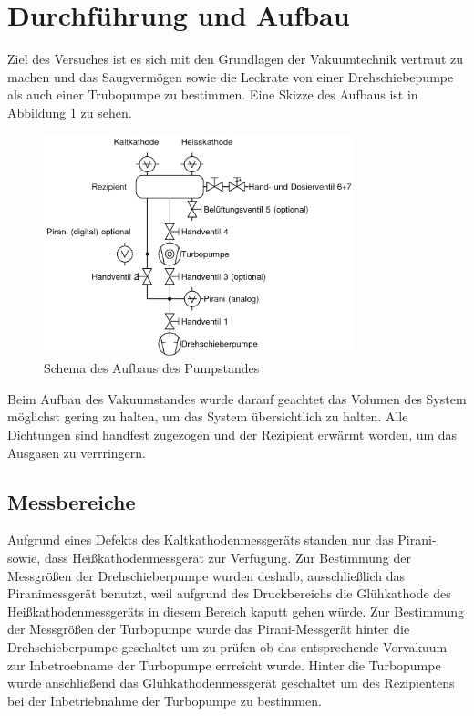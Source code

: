 \section{Durchführung und Aufbau}
\label{sec:Durchführung}
Ziel des Versuches ist es sich mit den Grundlagen der Vakuumtechnik vertraut zu machen und das Saugvermögen sowie die Leckrate von einer Drehschiebepumpe als auch einer Trubopumpe zu bestimmen. Eine Skizze des Aufbaus ist in Abbildung \ref{fig:pump} zu sehen. 
\begin{figure}[htpb]
  \centering
\includegraphics[width=0.8\textwidth]{picture/pumpaufbau.png}
\caption{Schema des Aufbaus des Pumpstandes \cite{Pfeiffer}}
  \label{fig:pump}
\end{figure}
Beim Aufbau des Vakuumstandes wurde darauf geachtet das Volumen des System möglichst gering zu halten, um das System übersichtlich zu halten. Alle Dichtungen sind handfest zugezogen und der Rezipient erwärmt worden, um das Ausgasen zu verrringern. 
\subsection{Messbereiche}
Aufgrund eines Defekts des Kaltkathodenmessgeräts standen nur das Pirani- sowie, dass Heißkathodenmessgerät zur Verfügung. Zur Bestimmung der Messgrößen der Drehschieberpumpe wurden deshalb, ausschließlich das Piranimessgerät benutzt, weil aufgrund des Druckbereichs die Glühkathode des Heißkathodenmessgeräts in diesem Bereich kaputt gehen würde. \newline
Zur Bestimmung der Messgrößen der Turbopumpe wurde das Pirani-Messgerät hinter die Drehschieberpumpe geschaltet um zu prüfen ob das entsprechende Vorvakuum zur Inbetroebname der Turbopumpe errreicht wurde. Hinter die Turbopumpe wurde anschließend das Glühkathodenmessgerät geschaltet um des Rezipientens bei der Inbetriebnahme der Turbopumpe zu bestimmen. 
